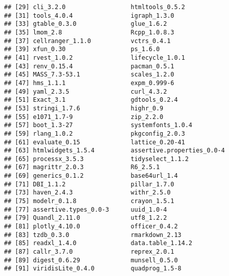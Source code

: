 \documentclass[
]{article}
\begin{document}
\begin{verbatim}
## [29] cli_3.2.0                  htmltools_0.5.2           
## [31] tools_4.0.4                igraph_1.3.0              
## [33] gtable_0.3.0               glue_1.6.2                
## [35] lmom_2.8                   Rcpp_1.0.8.3              
## [37] cellranger_1.1.0           vctrs_0.4.1               
## [39] xfun_0.30                  ps_1.6.0                  
## [41] rvest_1.0.2                lifecycle_1.0.1           
## [43] renv_0.15.4                pacman_0.5.1              
## [45] MASS_7.3-53.1              scales_1.2.0              
## [47] hms_1.1.1                  expm_0.999-6              
## [49] yaml_2.3.5                 curl_4.3.2                
## [51] Exact_3.1                  gdtools_0.2.4             
## [53] stringi_1.7.6              highr_0.9                 
## [55] e1071_1.7-9                zip_2.2.0                 
## [57] boot_1.3-27                systemfonts_1.0.4         
## [59] rlang_1.0.2                pkgconfig_2.0.3           
## [61] evaluate_0.15              lattice_0.20-41           
## [63] htmlwidgets_1.5.4          assertive.properties_0.0-4
## [65] processx_3.5.3             tidyselect_1.1.2          
## [67] magrittr_2.0.3             R6_2.5.1                  
## [69] generics_0.1.2             base64url_1.4             
## [71] DBI_1.1.2                  pillar_1.7.0              
## [73] haven_2.4.3                withr_2.5.0               
## [75] modelr_0.1.8               crayon_1.5.1              
## [77] assertive.types_0.0-3      uuid_1.0-4                
## [79] Quandl_2.11.0              utf8_1.2.2                
## [81] plotly_4.10.0              officer_0.4.2             
## [83] tzdb_0.3.0                 rmarkdown_2.13            
## [85] readxl_1.4.0               data.table_1.14.2         
## [87] callr_3.7.0                reprex_2.0.1              
## [89] digest_0.6.29              munsell_0.5.0             
## [91] viridisLite_0.4.0          quadprog_1.5-8
\end{verbatim}
\end{document}

